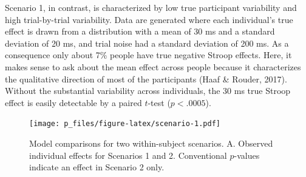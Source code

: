 \documentclass[
  english,
  ,man]{apa6}
\begin{document}
Scenario 1, in contrast, is characterized by low true participant variability and high trial-by-trial variability. Data are generated where each individual's true effect is drawn from a distribution with a mean of 30 ms and a standard deviation of 20 ms, and trial noise had a standard deviation of 200 ms. As a consequence only about 7\% people have true negative Stroop effects. Here, it makes sense to ask about the mean effect across people because it characterizes the qualitative direction of most of the participants (Haaf \& Rouder, 2017). Without the substantial variability across individuals, the 30 ms true Stroop effect is easily detectable by a paired \(t\)-test (\(p <.0005\)).

\begin{figure}
\centering
\texttt{[image: p\_files/figure-latex/scenario-1.pdf]}
\caption{\label{fig:scenario}Model comparisons for two within-subject scenarios. A. Observed individual effects for Scenarios 1 and 2. Conventional \(p\)-values indicate an effect in Scenario 2 only.}
\end{figure}
\end{document}
